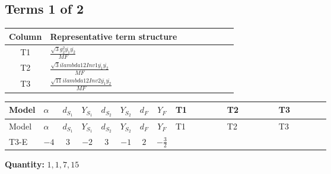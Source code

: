 \documentclass[8pt]{article}
\begin{document}
\begin{landscape}
\subsection*{Terms 1 of 2}
\begin{center}
\begin{tabular}{@{}c >{\raggedright\arraybackslash}p{0.82\linewidth}@{}}
\toprule
Column & Representative term structure \\
\midrule
T1 & \(\displaystyle \frac{\sqrt{3} g_{2}^{2} \overline{y_{1}} \overline{y_{2}}}{MF}\) \\
\midrule
T2 & \(\displaystyle \frac{\sqrt{3} i lambda12Inv1 \overline{y_{1}} \overline{y_{2}}}{MF}\) \\
\midrule
T3 & \(\displaystyle \frac{\sqrt{11} i lambda12Inv2 \overline{y_{1}} \overline{y_{2}}}{MF}\) \\
\midrule
\bottomrule
\end{tabular}
\end{center}
\smallskip
\tiny
\begin{longtable}{@{}llcccccc >{\raggedright\arraybackslash}p{0.21\linewidth} >{\raggedright\arraybackslash}p{0.21\linewidth} >{\raggedright\arraybackslash}p{0.21\linewidth}@{}}
\toprule
Model & $\alpha$ & $d_{S_1}$ & $Y_{S_1}$ & $d_{S_2}$ & $Y_{S_2}$ & $d_F$ & $Y_F$ & T1 & T2 & T3 \\
\midrule
\endfirsthead
\toprule
Model & $\alpha$ & $d_{S_1}$ & $Y_{S_1}$ & $d_{S_2}$ & $Y_{S_2}$ & $d_F$ & $Y_F$ & T1 & T2 & T3 \\
\midrule
\endhead
T3-E & $-4$ & $3$ & $-2$ & $3$ & $-1$ & $2$ & $-\frac{3}{2}$ & \scriptsize\adjustbox{max width=\linewidth}{$\begin{gathered} \frac{\sqrt{3} g_{2}^{2} \overline{y_{1}} \overline{y_{2}}}{6 MF}\end{gathered}$} & \scriptsize\adjustbox{max width=\linewidth}{$\begin{gathered} - \frac{\sqrt{3} i lambda12Inv1 \overline{y_{1}} \overline{y_{2}}}{6 MF}\end{gathered}$} & \scriptsize\adjustbox{max width=\linewidth}{$\begin{gathered} \frac{3 \sqrt{11} i lambda12Inv2 \overline{y_{1}} \overline{y_{2}}}{22 MF}\end{gathered}$} \\
\midrule
\bottomrule
\end{longtable}
\clearpage
\noindent\textbf{Quantity: }$\mathrm{1,1,7,15}$\par\smallskip

\end{landscape}
\end{document}
